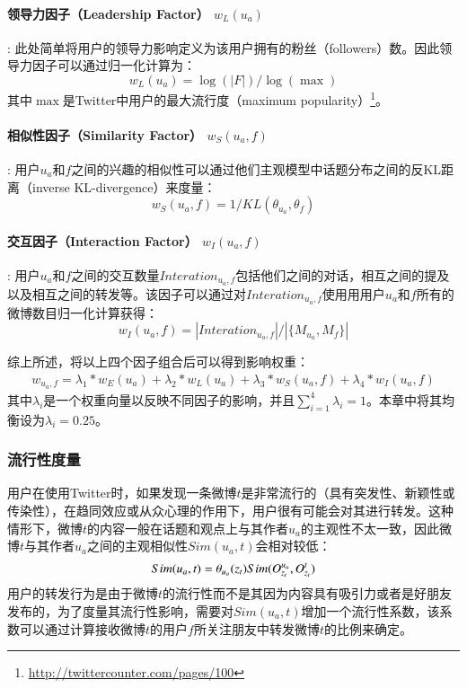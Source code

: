 \paragraph{领导力因子（Leadership Factor） $ w_L(u_a) $}: 
此处简单将用户的领导力影响定义为该用户拥有的粉丝（followers）数。因此领导力因子可以通过归一化计算为：
\begin{equation}
w_L(u_a)=\log (|F|)/\log(\max)
\end{equation}
其中$ \max $是Twitter中用户的最大流行度（maximum popularity）\footnote{\url{http://twittercounter.com/pages/100}}。

\paragraph{相似性因子（Similarity Factor） $ w_S(u_a,f) $}: 
用户$ u_a $和$ f $之间的兴趣的相似性可以通过他们主观模型中话题分布之间的反KL距离（inverse KL-divergence）来度量：
\begin{equation}
w_S(u_a,f)= 1/KL(\theta_{u_a},\theta_f)
\end{equation}

\paragraph{交互因子（Interaction Factor） $ w_I(u_a,f) $}: 
用户$ u_a $和$ f $之间的交互数量$ Interation_{u_a,f} $包括他们之间的对话，相互之间的提及以及相互之间的转发等。该因子可以通过对$Interation_{u_a,f}$使用用用户$ u_a $和$ f $所有的微博数目归一化计算获得：
\begin{equation}
w_I(u_a,f)=|Interation_{u_a,f}| /|\{ M_{u_a}, M_f \}|
\end{equation}

综上所述，将以上四个因子组合后可以得到影响权重：
\begin{equation}
\begin{split}
w_{u_a,f}= \lambda_1*w_E(u_a)+\lambda_2*w_L(u_a)+
  \lambda_3*w_S(u_a,f)+\lambda_4*w_I(u_a,f)
\end{split}
\end{equation}
其中$ \lambda_i $是一个权重向量以反映不同因子的影响，并且$ \sum_{i=1}^{4}\lambda_i=1 $。本章中将其均衡设为$ \lambda_i=0.25 $。

\subsubsection{流行性度量}
用户在使用Twitter时，如果发现一条微博$ t $是非常流行的（具有突发性、新颖性或传染性），在趋同效应或从众心理的作用下，用户很有可能会对其进行转发。这种情形下，微博$ t $的内容一般在话题和观点上与其作者$ u_a $的主观性不太一致，因此微博$ t $与其作者$ u_a $之间的主观相似性$ Sim(u_a,t) $会相对较低：
\begin{equation}
Sim(u_a,t)=\theta_{u_a}(z_t)\* Sim(O_{z_t}^{u_a},O_{z_t}^{t})
\end{equation}
用户的转发行为是由于微博$ t $的流行性而不是其因为内容具有吸引力或者是好朋友发布的，为了度量其流行性影响，需要对$ Sim(u_a,t) $增加一个流行性系数，该系数可以通过计算接收微博$ t $的用户$ f $所关注朋友中转发微博$ t $的比例来确定。

